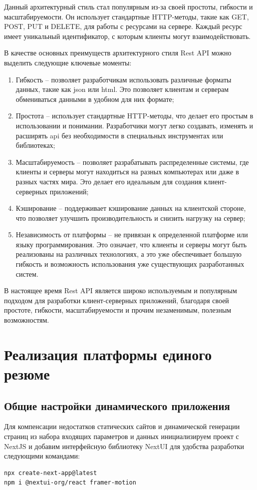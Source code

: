 \documentclass[master, och, pract]{SCWorks}
\begin{document}
Данный архитектурный стиль стал популярным из-за своей простоты, гибкости и масштабируемости. Он использует стандартные HTTP-методы, такие как GET, POST, PUT и DELETE, для работы с ресурсами на сервере. Каждый ресурс имеет уникальный идентификатор, с которым клиенты могут взаимодействовать.

В качестве основных преимуществ архитектурного стиля Rest API можно выделить следующие ключевые моменты:
\begin{enumerate}
    \item Гибкость – позволяет разработчикам использовать различные форматы данных, такие как json или html. Это позволяет клиентам и серверам обмениваться данными в удобном для них формате;
    \item Простота – использует стандартные HTTP-методы, что делает его простым в использовании и понимании. Разработчики могут легко создавать, изменять и расширять api без необходимости в специальных инструментах или библиотеках;
    \item Масштабируемость – позволяет разрабатывать распределенные системы, где клиенты и серверы могут находиться на разных компьютерах или даже в разных частях мира. Это делает его идеальным для создания клиент-серверных приложений;
    \item Кэширование – поддерживает кэширование данных на клиентской стороне, что позволяет улучшить производительность и снизить нагрузку на сервер;
    \item Независимость от платформы – не привязан к определенной платформе или языку программирования. Это означает, что клиенты и серверы могут быть реализованы на различных технологиях, а это уже обеспечивает большую гибкость и возможность использования уже существующих разработанных систем.\cite{Masse_rest}
\end{enumerate}

В настоящее время Rest API является широко используемым и популярным подходом для разработки клиент-серверных приложений, благодаря своей простоте, гибкости, масштабируемости и прочим незаменимым, полезным возможностям.






\section{Реализация платформы единого резюме}
\subsection{Общие настройки динамического приложения}
Для компенсации недостатков статических сайтов и динамической генерации страниц из набора входящих параметров и данных инициализируем проект с NextJS и добавим интерфейсную библиотеку NextUI для удобства разработки следующими командами:
\begin{verbatim}
npx create-next-app@latest
npm i @nextui-org/react framer-motion
\end{verbatim}
\end{document}
